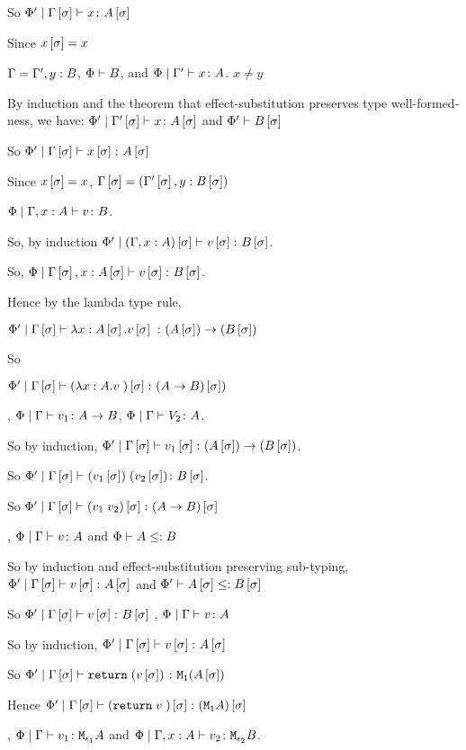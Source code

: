{So $\etyperelation{\P'}{\G\ssi}{x}{A\ssi}$

Since $x\ssi = x$

\bi $\G = \G', y:B$, $\wellformed{\P}{B}$, and $\etyperelation{\P}{\G'}{x}{A}$. $x \neq y$

By induction and the theorem that effect-substitution preserves type well-formed-ness, we have: $\etyperelation{\P'}{\G'\ssi}{x}{A\ssi}$ and $\wellformed{\P'}{B\ssi}$

So $\etyperelation{\P'}{\G\ssi}{x\ssi}{A\ssi}$

Since $x\ssi = x$, $\G\ssi = (\G'\ssi, y:B\ssi)$


\bi $\etyperelation{\P}{\gax}{v}{B}$.

So, by induction $\etyperelation{\P'}{(\gax)\ssi}{v\ssi}{B\ssi}$.

So, $\etyperelation{\P}{\G\ssi, x:A\ssi}{v\ssi}{B\ssi}$.

Hence by the lambda type rule,

$\etyperelation{\P'}{\G\ssi}{\lam{x}{A\ssi}{v\ssi}}{\fntype{(A\ssi)}{(B\ssi)}}$

So

$\etyperelation{\P'}{\G\ssi}{(\lam{x}{A}{v})\ssi}{(\ab)\ssi)}$

\bi, $\gpetyperelation{v_1}{\ab}$, $\gpetyperelation{V_2}{A}$.

So by induction, $\etyperelation{\P'}{\G\ssi}{v_1\ssi}{\fntype{(A\ssi)}{(B\ssi)}}$.

So $\etyperelation{\P'}{\G\ssi}{\apply{(v_1\ssi)}{(v_2\ssi)}}{B\ssi}$.

So $\etyperelation{\P'}{\G\ssi}{(\apply{v_1}{v_2})\ssi}{(\ab)\ssi}$

\bi, $\gpetyperelation{v}{A}$ and $\wellformed{\P}{A\subtype B}$

So by induction and effect-substitution preserving sub-typing, $\etyperelation{\P'}{\G\ssi}{v\ssi}{A\ssi}$ and $\wellformed{\P'}{A\ssi\subtype B\ssi}$

So $\etyperelation{\P'}{\G\ssi}{v\ssi}{B\ssi}$
\bi, $\gpetyperelation{v}{A}$

So by induction, $\etyperelation{\P'}{\G\ssi}{v\ssi}{A\ssi}$

So $\etyperelation{\P'}{\G\ssi}{\return{(v\ssi)}}{\M{\1}{(A\ssi)}}$

Hence $\etyperelation{\P'}{\G\ssi}{(\return{v})\ssi}{(\moa)\ssi}$

\bi, $\gpetyperelation{v_1}{\M{\e_1}{A}}$ and $\etyperelation{\P}{\gax}{v_2}{\M{\e_2}{B}}$.

}
